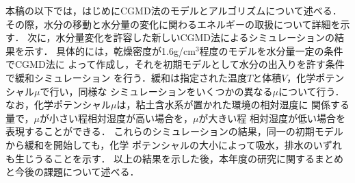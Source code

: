 本稿の以下では，はじめにCGMD法のモデルとアルゴリズムについて述べる．
その際，水分の移動と水分量の変化に関わるエネルギーの取扱について詳細を示す．
次に，水分量変化を許容した新しいCGMD法によるシミュレーションの結果を示す．
具体的には，乾燥密度が1.6g/cm$^3$程度のモデルを水分量一定の条件でCGMD法に
よって作成し，それを初期モデルとして水分の出入りを許す条件で緩和シミュレーション
を行う．緩和は指定された温度$T$と体積$V$，化学ポテンシャル$\mu$で行い，同様な
シミュレーションをいくつかの異なる$\mu$について行う．
なお，化学ポテンシャル$\mu$は，粘土含水系が置かれた環境の相対湿度に
関係する量で，$\mu$が小さい程相対湿度が高い場合を，$\mu$が大きい程
相対湿度が低い場合を表現することができる．
これらのシミュレーションの結果，同一の初期モデルから緩和を開始しても，化学
ポテンシャルの大小によって吸水，排水のいずれも生じうることを示す．
以上の結果を示した後，本年度の研究に関するまとめと今後の課題について述べる．
